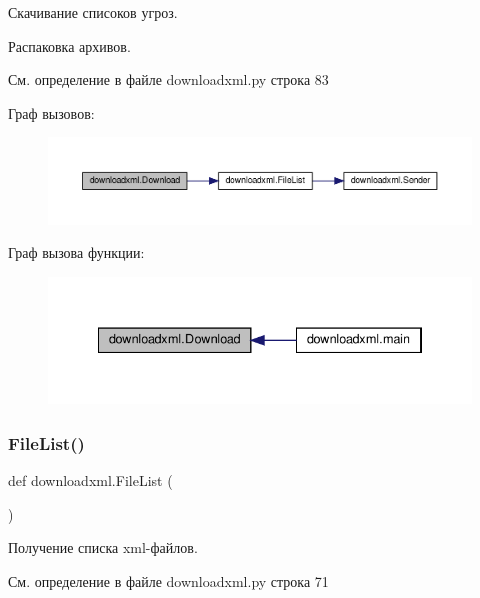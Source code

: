 Скачивание списоков угроз. 

Распаковка архивов. 

См. определение в файле downloadxml.\+py строка 83

Граф вызовов\+:\nopagebreak
\begin{figure}[H]
\begin{center}
\leavevmode
\includegraphics[width=350pt]{namespacedownloadxml_a801fc32a7254a9319cb06fb65fb757e9_cgraph}
\end{center}
\end{figure}
Граф вызова функции\+:\nopagebreak
\begin{figure}[H]
\begin{center}
\leavevmode
\includegraphics[width=334pt]{namespacedownloadxml_a801fc32a7254a9319cb06fb65fb757e9_icgraph}
\end{center}
\end{figure}
\mbox{\label{namespacedownloadxml_ae15b4d4f7f282d34e48e03a2452741d6}} 
\subsubsection{\texorpdfstring{File\+List()}{FileList()}}
{\footnotesize\ttfamily def downloadxml.\+File\+List (\begin{DoxyParamCaption}{ }\end{DoxyParamCaption})}



Получение списка xml-\/файлов. 



См. определение в файле downloadxml.\+py строка 71

